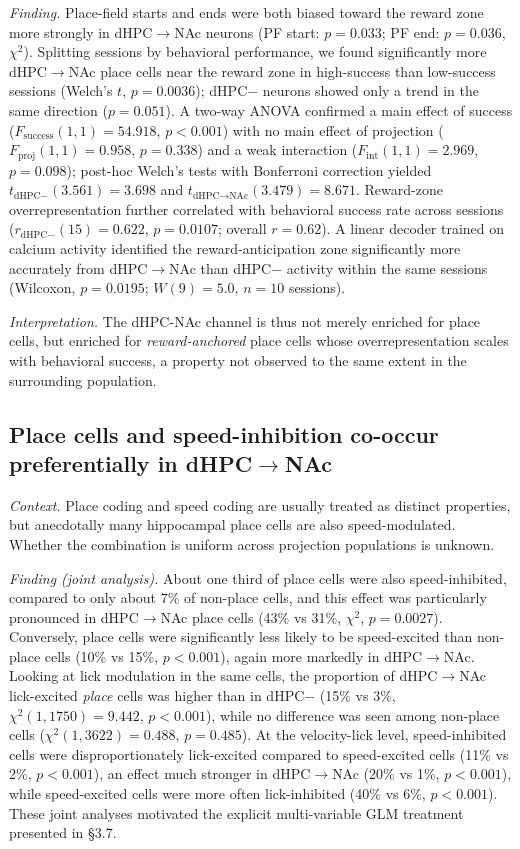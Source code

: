 \documentclass[11pt]{article}
\begin{document}
\textit{Finding.} Place-field starts and ends were both biased toward the reward zone more strongly in dHPC$\rightarrow$NAc neurons (PF start: $p=0.033$; PF end: $p=0.036$, $\chi^2$). Splitting sessions by behavioral performance, we found significantly more dHPC$\rightarrow$NAc place cells near the reward zone in high-success than low-success sessions (Welch's $t$, $p=0.0036$); dHPC$-$ neurons showed only a trend in the same direction ($p=0.051$). A two-way ANOVA confirmed a main effect of success ($F_{\text{success}}(1,1)=54.918$, $p<0.001$) with no main effect of projection ($F_{\text{proj}}(1,1)=0.958$, $p=0.338$) and a weak interaction ($F_{\text{int}}(1,1)=2.969$, $p=0.098$); post-hoc Welch's tests with Bonferroni correction yielded $t_{\text{dHPC}-}(3.561)=3.698$ and $t_{\text{dHPC}\rightarrow\text{NAc}}(3.479)=8.671$. Reward-zone overrepresentation further correlated with behavioral success rate across sessions ($r_{\text{dHPC}-}(15)=0.622$, $p=0.0107$; overall $r=0.62$). A linear decoder trained on calcium activity identified the reward-anticipation zone significantly more accurately from dHPC$\rightarrow$NAc than dHPC$-$ activity within the same sessions (Wilcoxon, $p=0.0195$; $W(9)=5.0$, $n=10$ sessions).

\textit{Interpretation.} The dHPC-NAc channel is thus not merely enriched for place cells, but enriched for \emph{reward-anchored} place cells whose overrepresentation scales with behavioral success, a property not observed to the same extent in the surrounding population.

\subsection{Place cells and speed-inhibition co-occur preferentially in dHPC$\rightarrow$NAc}

\textit{Context.} Place coding and speed coding are usually treated as distinct properties, but anecdotally many hippocampal place cells are also speed-modulated. Whether the combination is uniform across projection populations is unknown.

\textit{Finding (joint analysis).} About one third of place cells were also speed-inhibited, compared to only about 7\% of non-place cells, and this effect was particularly pronounced in dHPC$\rightarrow$NAc place cells (43\% vs 31\%, $\chi^2$, $p=0.0027$). Conversely, place cells were significantly less likely to be speed-excited than non-place cells (10\% vs 15\%, $p<0.001$), again more markedly in dHPC$\rightarrow$NAc. Looking at lick modulation in the same cells, the proportion of dHPC$\rightarrow$NAc lick-excited \emph{place} cells was higher than in dHPC$-$ (15\% vs 3\%, $\chi^2(1,1750)=9.442$, $p<0.001$), while no difference was seen among non-place cells ($\chi^2(1,3622)=0.488$, $p=0.485$). At the velocity-lick level, speed-inhibited cells were disproportionately lick-excited compared to speed-excited cells (11\% vs 2\%, $p<0.001$), an effect much stronger in dHPC$\rightarrow$NAc (20\% vs 1\%, $p<0.001$), while speed-excited cells were more often lick-inhibited (40\% vs 6\%, $p<0.001$). These joint analyses motivated the explicit multi-variable GLM treatment presented in \S3.7.
\end{document}
